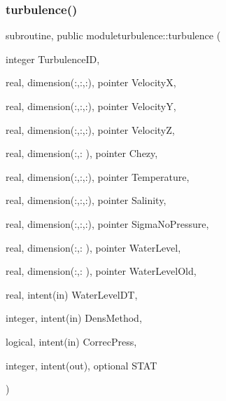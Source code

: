 \subsubsection{\texorpdfstring{turbulence()}{turbulence()}}
{\footnotesize\ttfamily subroutine, public moduleturbulence\+::turbulence (\begin{DoxyParamCaption}\item[{integer}]{Turbulence\+ID,  }\item[{real, dimension(\+:,\+:,\+:), pointer}]{VelocityX,  }\item[{real, dimension(\+:,\+:,\+:), pointer}]{VelocityY,  }\item[{real, dimension(\+:,\+:,\+:), pointer}]{VelocityZ,  }\item[{real, dimension(\+:,\+:  ), pointer}]{Chezy,  }\item[{real, dimension(\+:,\+:,\+:), pointer}]{Temperature,  }\item[{real, dimension(\+:,\+:,\+:), pointer}]{Salinity,  }\item[{real, dimension(\+:,\+:,\+:), pointer}]{Sigma\+No\+Pressure,  }\item[{real, dimension(\+:,\+:  ), pointer}]{Water\+Level,  }\item[{real, dimension(\+:,\+:  ), pointer}]{Water\+Level\+Old,  }\item[{real, intent(in)}]{Water\+Level\+DT,  }\item[{integer, intent(in)}]{Dens\+Method,  }\item[{logical, intent(in)}]{Correc\+Press,  }\item[{integer, intent(out), optional}]{S\+T\+AT }\end{DoxyParamCaption})}

